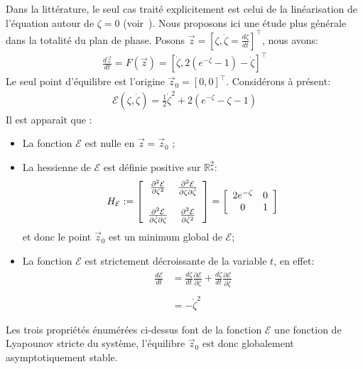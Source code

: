 Dans la littérature, le seul cas traité explicitement est celui de la linéarisation de l'équation autour de $\zeta=0$
(voir~\citet{chandra39}).
Nous proposons ici une étude plus générale dans la totalité du plan de phase. Posons $\vec{z}=\left[
\zeta,\dot{\zeta}=\frac{d\zeta}{dt}\right]^{\top}$, nous avons:
\begin{align}
\frac{d\vec{z}}{dt} =F\left(  \vec{z}\right)  =
\left[\dot{\zeta},2\left(  e^{-\zeta}-1\right)-\dot{\zeta}\right]^{\top} \label{sysdif}%
\end{align}
Le seul point d'équilibre est l'origine $\vec{z}_0=\left[  0,0\right]
^{\top}$. Considérons à présent:
\begin{align*}
\mathcal{E}(\zeta,\dot{\zeta}) = \frac{1}{2}\dot{\zeta}^2+2(e^{-\zeta}-\zeta-1)
\end{align*}
Il est apparaît que :
\begin{itemize}
\item La fonction $\mathcal{E}$ est nulle en $\vec{z}=\vec{z}_0$ ;
\item La hessienne de $\mathcal{E}$ est définie positive sur $\mathbb{R}^2_*$: 
\begin{align*}
H_{\mathcal{E}}:=
\left[
\begin{array}
[c]{cc}%
\frac{\partial^2 \mathcal{E}}{\partial \zeta^2}         & \frac{\partial^2 \mathcal{E}}{\partial \zeta \partial \dot{\zeta}}\\
 & \\
\frac{\partial^2 \mathcal{E}}{\partial \dot{\zeta} \partial \zeta}& \frac{\partial^2 \mathcal{E}}{\partial \dot{\zeta}^2}
\end{array}
\right]
=\left[\begin{array}
[c]{cc}%
2e^{-\zeta}         & 0\\
0& 1
\end{array}
\right]
\end{align*}
et donc le point $\vec{z}_0$ est un minimum global de $\mathcal{E}$;
\item La fonction $\mathcal{E}$ est strictement décroissante de la variable $t$, en effet:
\begin{align*}
\frac{d\mathcal{E}}{dt}&=\frac{d\zeta}{dt}\frac{\partial \mathcal{E}}{\partial \zeta}+\frac{d\dot{\zeta}}{dt}\frac{\partial \mathcal{E}}{\partial \dot{\zeta}} \\
\\
&=-\dot{\zeta}^2 
\end{align*}

\end{itemize}
Les trois propriétés énumérées ci-dessus font de la fonction $\mathcal{E}$ une fonction de Lyapounov stricte du système, l'équilibre $\vec{z}_0$ est donc globalement asymptotiquement stable. 


